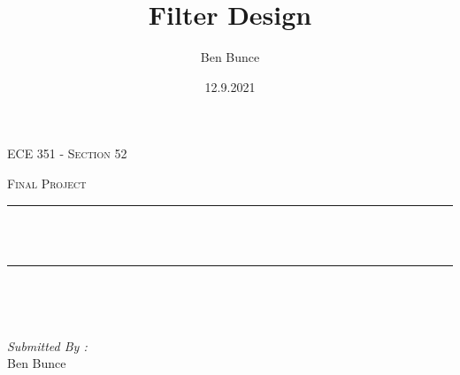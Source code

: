 \documentclass[12pt]{report}
\title{Filter Design}
\author{Ben Bunce}
\date{12.9.2021}
\makeatletter
\let\thetitle\@title
\makeatother
\begin{document}

\begin{titlepage}
	\centering
    \vspace*{0.5 cm}
\begin{center}    \textsc{\Large   ECE 351 - Section 52}\\[2.0 cm]	\end{center}%
	\textsc{\Large Final Project  }\\[0.5 cm]				%
	\rule{\linewidth}{0.2 mm} \\[0.4 cm]
	{ \huge \bfseries \thetitle}\\
	\rule{\linewidth}{0.2 mm} \\[1.5 cm]
	
	\begin{minipage}{0.4\textwidth}
		\begin{flushleft} \large
			\end{flushleft}
			\end{minipage}~
			\begin{minipage}{0.4\textwidth}
            
			\begin{flushright} \large
			\emph{Submitted By :} \\
			Ben Bunce  
		\end{flushright}
           
	\end{minipage}\\[2 cm]
	
    
    
    
    
	
\end{titlepage}


\tableofcontents
\pagebreak

\renewcommand{\thesection}{\arabic{section}}
\end{document}
